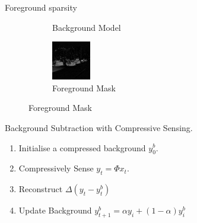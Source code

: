 \documentclass{beamer}
\begin{document}
\begin{frame}{Foreground sparsity}
\begin{figure}[h]
\begin{subfigure}[b]{0.3\textwidth}
                \caption{Background Model}
                 \end{subfigure}
\quad
\begin{subfigure}[b]{0.3\textwidth}
                \centering
                \includegraphics[width=\textwidth]{fgSp}
                \caption{Foreground Mask}
                 \end{subfigure}
\end{figure}

      \end{frame}

      
      \begin{frame}{Background Subtraction with Compressive Sensing.}

\begin{enumerate}
\item Initialise a compressed background $y^b_0$.
\item Compressively Sense $y_t = \Phi x_t$.
\item Reconstruct   $\Delta (y_t - y^b_t)$
\item Update Background  $y^b_{t+1} = \alpha y_i + (1 - \alpha)y^b_i$
\end{enumerate}
\end{frame}
\end{document}
